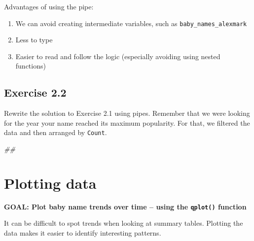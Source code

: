 \documentclass[
]{book}
\newenvironment{Shaded}{\begin{snugshade}}{\end{snugshade}}
\newcommand{\CommentTok}[1]{\textcolor[rgb]{0.56,0.35,0.01}{\textit{#1}}}
\newcommand{\KeywordTok}[1]{\textcolor[rgb]{0.13,0.29,0.53}{\textbf{#1}}}
\newcommand{\NormalTok}[1]{#1}
\newcommand{\OperatorTok}[1]{\textcolor[rgb]{0.81,0.36,0.00}{\textbf{#1}}}
\newcommand{\StringTok}[1]{\textcolor[rgb]{0.31,0.60,0.02}{#1}}
\providecommand{\tightlist}{%
  \setlength{\itemsep}{0pt}\setlength{\parskip}{0pt}}
\begin{document}
\begin{Shaded}
\end{Shaded}

Advantages of using the pipe:

\begin{enumerate}
\def\labelenumi{\arabic{enumi}.}
\tightlist
\item
  We can avoid creating intermediate variables, such as \texttt{baby\_names\_alexmark}
\item
  Less to type
\item
  Easier to read and follow the logic (especially avoiding using nested functions)
\end{enumerate}

\hypertarget{exercise-2.2}{%
\subsection{Exercise 2.2}\label{exercise-2.2}}

Rewrite the solution to Exercise 2.1 using pipes. Remember that we were looking
for the year your name reached its maximum popularity. For that, we filtered
the data and then arranged by \texttt{Count}.

\begin{Shaded}
\begin{Highlighting}[]
\CommentTok{##}
\end{Highlighting}
\end{Shaded}

\hypertarget{plotting-data}{%
\section{Plotting data}\label{plotting-data}}

\textbf{GOAL: Plot baby name trends over time -- using the \texttt{qplot()} function}

It can be difficult to spot trends when looking at summary tables.
Plotting the data makes it easier to identify interesting patterns.
\end{document}
